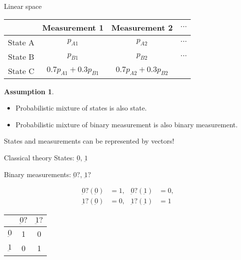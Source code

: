 \documentclass{beamer}
\newcommand\emm[1]{\textcolor{redorange}{{#1}}}
\theoremstyle{definition}
\newtheorem{assumption}{Assumption}
\begin{document}
\begin{frame}{Linear space}
\begin{tabular}{|c||c|c|c|}
\hline
& Measurement 1 & Measurement 2 & $\cdots$\\
\hline
\hline
State A& $p_{A1}$ & $p_{A2}$ & $\cdots$\\
State B& $p_{B1}$ & $p_{B2}$ & $\cdots$\\
State C& $0.7p_{A1} + 0.3 p_{B1}$ & $0.7p_{A2} + 0.3 p_{B2}$&\\
\hline
\end{tabular}

\vspace{1em}
\begin{assumption}
\begin{itemize}
\item \emm{Probabilistic mixture} of states is also state.
\item \emm{Probabilistic mixture} of binary measurement is also binary measurement.
\end{itemize}
\end{assumption}

\vspace{1em}
\centering
States and measurements can be represented by vectors!

\end{frame}

\begin{frame}{Classical theory}
States: $\underbar{0}$, $\underbar{1}$

Binary measurements: $\underbar{0}?$, $\underbar{1}?$

\begin{align*}
\underbar{0}?(\underbar{0}) &= 1,&
\underbar{0}?(\underbar{1}) &= 0,\\
\underbar{1}?(\underbar{0}) &= 0,&
\underbar{1}?(\underbar{1}) &= 1
\end{align*}

\begin{center}
\begin{tabular}{|c||c|c|}
\hline
& $\underbar{0}?$& $\underbar{1}?$\\
\hline
\hline
$\underbar{0}$& 1&0\\
\hline
$\underbar{1}$& 0&1\\
\hline
\end{tabular}
\end{center}
\end{frame}
\end{document}
